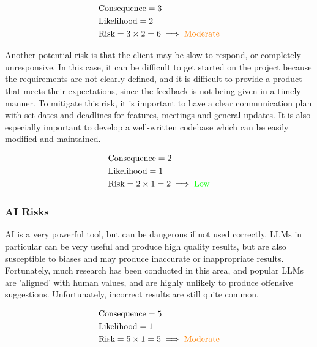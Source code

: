 \documentclass[11pt, a4paper]{article}
\begin{document}
\begin{equation*}
    \begin{aligned}
         & \text{Consequence}=3                                            \\
         & \text{Likelihood}=2                                             \\
         & \text{Risk}=3\times2=6 \implies {\color{orange}\text{Moderate}}
    \end{aligned}
\end{equation*}

\newpage

\noindent Another potential risk is that the client may be slow to respond, or completely unresponsive. In this case, it can be difficult to get started on the project because the requirements are not clearly defined, and it is difficult to provide a product that meets their expectations, since the feedback is not being given in a timely manner. To mitigate this risk, it is important to have a clear communication plan with set dates and deadlines for features, meetings and general updates. It is also especially important to develop a well-written codebase which can be easily modified and maintained.

\begin{equation*}
    \begin{aligned}
         & \text{Consequence}=2                                      \\
         & \text{Likelihood}=1                                       \\
         & \text{Risk}=2\times1=2 \implies {\color{green}\text{Low}}
    \end{aligned}
\end{equation*}

\subsubsection{AI Risks}

\noindent AI is a very powerful tool, but can be dangerous if not used correctly. LLMs in particular can be very useful and produce high quality results, but are also susceptible to biases and may produce inaccurate or inappropriate results. Fortunately, much research has been conducted in this area, and popular LLMs are 'aligned' with human values, and are highly unlikely to produce offensive suggestions. Unfortunately, incorrect results are still quite common.

\begin{equation*}
    \begin{aligned}
         & \text{Consequence}=5                                            \\
         & \text{Likelihood}=1                                             \\
         & \text{Risk}=5\times1=5 \implies {\color{orange}\text{Moderate}}
    \end{aligned}
\end{equation*}
\end{document}
